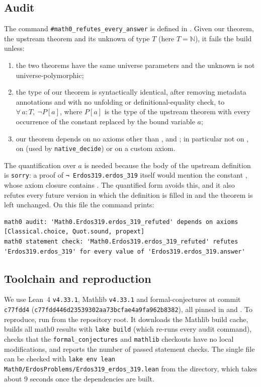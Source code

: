 \documentclass[11pt]{amsart}
\theoremstyle{plain}
\theoremstyle{definition}
\newcommand{\N}{\mathbb{N}}
\begin{document}
\subsection*{Audit}
The command \texttt{\#math0\_refutes\_every\_answer} is defined in . Given our theorem, the upstream theorem  and its unknown  of type $T$ (here $T=\N$), it fails the build unless:
\begin{enumerate}
\item the two theorems have the same universe parameters and the unknown is not universe-polymorphic;
\item the type of our theorem is syntactically identical, after removing metadata annotations and with no unfolding or definitional-equality check, to $\forall\, a : T,\ \neg P[a]$, where $P[a]$ is the type of the upstream theorem with every occurrence of the constant  replaced by the bound variable $a$;
\item our theorem depends on no axioms other than ,  and ; in particular not on , on  (used by \texttt{native\_decide}) or on a custom axiom.
\end{enumerate}
The quantification over $a$ is needed because the body of the upstream definition is \texttt{sorry}: a proof of \texttt{¬ Erdos319.erdos\_319} itself would mention the constant , whose axiom closure contains . The quantified form avoids this, and it also refutes every future version in which the definition is filled in and the theorem is left unchanged. On this file the command prints:
\begin{lstlisting}
math0 audit: 'Math0.Erdos319.erdos_319_refuted' depends on axioms [Classical.choice, Quot.sound, propext]
math0 statement check: 'Math0.Erdos319.erdos_319_refuted' refutes 'Erdos319.erdos_319' for every value of 'Erdos319.erdos_319.answer'
\end{lstlisting}

\subsection*{Toolchain and reproduction}
We use Lean~4 \cite{Lean4} \texttt{v4.33.1}, Mathlib \cite{Mathlib} \texttt{v4.33.1} and formal-conjectures \cite{FC} at commit \texttt{c77fdd4} (\texttt{c77fdd446d23539302aa73bcfae4a9fa962b8382}), all pinned in  and . To reproduce, run  from the repository root. It downloads the Mathlib build cache, builds all math0 results with \texttt{lake build} (which re-runs every audit command), checks that the \texttt{formal\_conjectures} and \texttt{mathlib} checkouts have no local modifications, and reports the number of passed statement checks. The single file can be checked with \texttt{lake env lean Math0/ErdosProblems/Erdos319\_erdos\_319.lean} from the  directory, which takes about 9 seconds once the dependencies are built.
\end{document}
